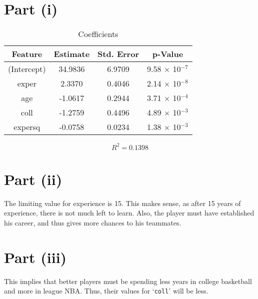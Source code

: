 \documentclass{./solution}
\author{%
    Bhavishya Desai\\[-1mm]
    160194
    \and
    Nikhil Bansal\\[-1mm]
    160447
    \and
    Nishant Maheshwari\\[-1mm]
    160458
    \and
    Harish Rajagopal\\[-1mm]
    160552
    \and
    Akhil Reddy\\[-1mm]
    160613
    \and
    Sameer Meena\\[-1mm]
    160616
}
\begin{document}
    \maketitle

    \begin{solution}[Wooldridge C6.9]
        \section{Part (i)}
            \begin{table}[H]
                \caption{Coefficients}
                \begin{tabularx}{\textwidth}{C C C C}
                    \toprule
                    Feature & Estimate & Std. Error & p-Value \\
                    \midrule
                    (Intercept) & 34.9836 & 6.9709 & 9.58 $\times$ 10$^{-7}$ \\
                    exper       &  2.3370 & 0.4046 & 2.14 $\times$ 10$^{-8}$ \\
                    age         & -1.0617 & 0.2944 & 3.71 $\times$ 10$^{-4}$ \\
                    coll        & -1.2759 & 0.4496 & 4.89 $\times$ 10$^{-3}$ \\
                    expersq     & -0.0758 & 0.0234 & 1.38 $\times$ 10$^{-3}$ \\
                    \bottomrule
                \end{tabularx}
            \end{table}
            \vspace{-5mm}
            $$ R^2 = 0.1398 $$

        \section{Part (ii)}
            The limiting value for experience is 15.
            This makes sense, as after 15 years of experience, there is not much left to learn.
            Also, the player must have established his career, and thus gives more chances to his teammates.

        \section{Part (iii)}
            This implies that better players must be spending less years in college basketball and more in league NBA.\@
            Thus, their values for `\texttt{coll}' will be less.


\end{solution}
\end{document}
